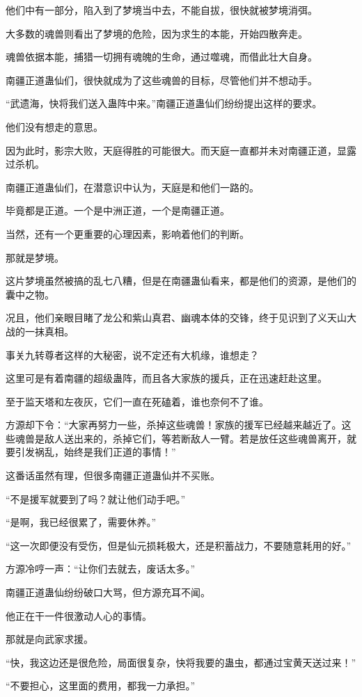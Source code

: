 \begin{this_body}
他们中有一部分，陷入到了梦境当中去，不能自拔，很快就被梦境消弭。

大多数的魂兽则看出了梦境的危险，因为求生的本能，开始四散奔走。

魂兽依据本能，捕猎一切拥有魂魄的生命，通过噬魂，而借此壮大自身。

南疆正道蛊仙们，很快就成为了这些魂兽的目标，尽管他们并不想动手。

“武遗海，快将我们送入蛊阵中来。”南疆正道蛊仙们纷纷提出这样的要求。

他们没有想走的意思。

因为此时，影宗大败，天庭得胜的可能很大。而天庭一直都并未对南疆正道，显露过杀机。

南疆正道蛊仙们，在潜意识中认为，天庭是和他们一路的。

毕竟都是正道。一个是中洲正道，一个是南疆正道。

当然，还有一个更重要的心理因素，影响着他们的判断。

那就是梦境。

这片梦境虽然被搞的乱七八糟，但是在南疆蛊仙看来，都是他们的资源，是他们的囊中之物。

况且，他们亲眼目睹了龙公和紫山真君、幽魂本体的交锋，终于见识到了义天山大战的一抹真相。

事关九转尊者这样的大秘密，说不定还有大机缘，谁想走？

这里可是有着南疆的超级蛊阵，而且各大家族的援兵，正在迅速赶赴这里。

至于监天塔和左夜灰，它们一直在死磕着，谁也奈何不了谁。

方源却下令：“大家再努力一些，杀掉这些魂兽！家族的援军已经越来越近了。这些魂兽是敌人送出来的，杀掉它们，等若断敌人一臂。若是放任这些魂兽离开，就要引发祸乱，始终是我们正道的事情！”

这番话虽然有理，但很多南疆正道蛊仙并不买账。

“不是援军就要到了吗？就让他们动手吧。”

“是啊，我已经很累了，需要休养。”

“这一次即便没有受伤，但是仙元损耗极大，还是积蓄战力，不要随意耗用的好。”

方源冷哼一声：“让你们去就去，废话太多。”

南疆正道蛊仙纷纷破口大骂，但方源充耳不闻。

他正在干一件很激动人心的事情。

那就是向武家求援。

“快，我这边还是很危险，局面很复杂，快将我要的蛊虫，都通过宝黄天送过来！”

“不要担心，这里面的费用，都我一力承担。”


\end{this_body}
